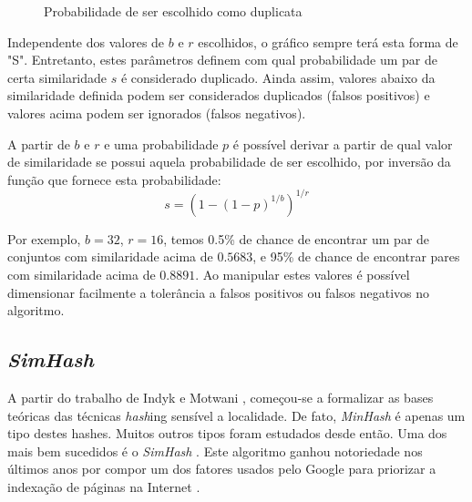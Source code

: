 \begin{figure}[!htbp]
\centering
{}
\caption{Probabilidade de ser escolhido como duplicata}
\label{fig:min:lshprob}
\end{figure}

Independente dos valores de $b$ e $r$ escolhidos, o gráfico sempre terá esta forma de "S". Entretanto, estes parâmetros definem com qual probabilidade um par de certa similaridade $s$ é considerado duplicado. Ainda assim, valores abaixo da similaridade definida podem ser considerados duplicados (falsos positivos) e valores acima podem ser ignorados (falsos negativos). 

A partir de $b$ e $r$ e uma probabilidade $p$ é possível derivar a partir de qual valor de similaridade se possui aquela probabilidade de ser escolhido, por inversão da função que fornece esta probabilidade:
\[
s = \left(1 - (1-p)^{1/b}\right)^{1/r}
\]

Por exemplo, $b=32$, $r=16$, temos 0.5\% de chance de encontrar um par de conjuntos com similaridade acima de $0.5683$, e 95\% de chance de encontrar pares com similaridade acima de $0.8891$. Ao manipular estes valores é possível dimensionar facilmente a tolerância a falsos positivos ou falsos negativos no algoritmo.

\subsection{\emph{SimHash}}

A partir do trabalho de Indyk e Motwani \cite{indyk1998approximate,gionis1999similarity}, começou-se a formalizar as bases teóricas das técnicas \emph{hash}ing sensível a localidade. De fato, \emph{MinHash} é apenas um tipo destes hashes. Muitos outros tipos foram estudados desde então. Uma dos mais bem sucedidos é o \emph{SimHash} \cite{charikar2002similarity}. Este algoritmo ganhou notoriedade nos últimos anos por compor um dos fatores usados pelo Google para priorizar a indexação de páginas na Internet \cite{manku2007detecting}.

